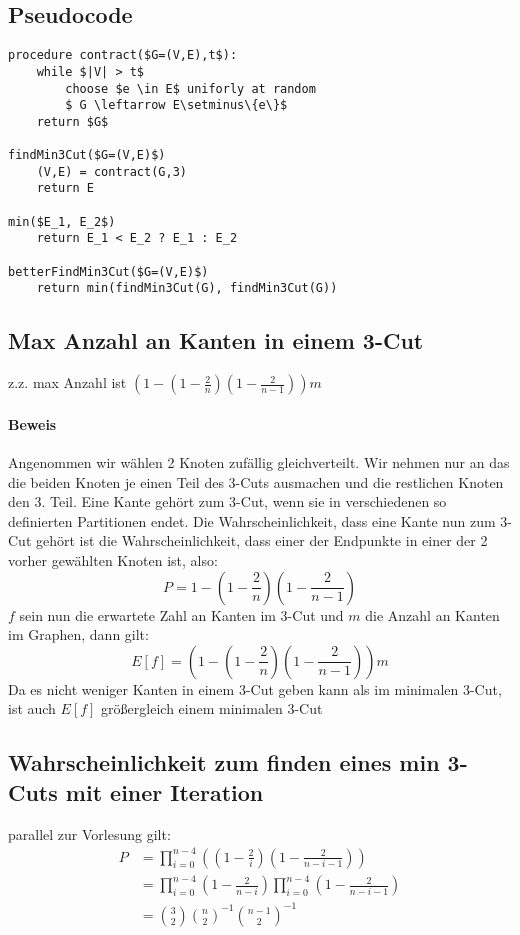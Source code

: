 \documentclass[a4paper,11pt,twoside]{scrartcl}
\begin{document}
\subsection{Pseudocode}
\begin{lstlisting}
procedure contract($G=(V,E),t$):
	while $|V| > t$
		choose $e \in E$ uniforly at random
		$ G \leftarrow E\setminus\{e\}$
	return $G$
	
findMin3Cut($G=(V,E)$)
	(V,E) = contract(G,3)
	return E

min($E_1, E_2$)
	return E_1 < E_2 ? E_1 : E_2
	
betterFindMin3Cut($G=(V,E)$)
	return min(findMin3Cut(G), findMin3Cut(G))
\end{lstlisting}
\subsection{Max Anzahl an Kanten in einem 3-Cut}
z.z. max Anzahl ist $ \left( 1-\left( 1-\frac{2}{n} \right)\left( 1-\frac{2}{n-1} \right) \right)m$
\paragraph{Beweis}
Angenommen wir wählen 2 Knoten zufällig gleichverteilt. Wir nehmen nur an das die beiden Knoten je einen Teil des 3-Cuts ausmachen und die restlichen Knoten den 3. Teil. Eine Kante gehört zum 3-Cut, wenn sie in verschiedenen so definierten Partitionen endet. Die Wahrscheinlichkeit, dass eine Kante nun zum 3-Cut gehört ist die Wahrscheinlichkeit, dass einer der Endpunkte in einer der 2 vorher gewählten Knoten ist, also:
\[ P = 1-\left( 1- \frac{2}{n} \right)\left( 1-\frac{2}{n-1} \right) \]
$f$ sein nun die erwartete Zahl an Kanten im 3-Cut und $m$ die Anzahl an Kanten im Graphen, dann gilt:
\[ E[f] = \left( 1-\left( 1-\frac{2}{n} \right)\left( 1-\frac{2}{n-1} \right) \right)m \]
Da es nicht weniger Kanten in einem 3-Cut geben kann als im minimalen 3-Cut, ist auch $E[f]$ größergleich einem minimalen 3-Cut
\subsection{Wahrscheinlichkeit zum finden eines min 3-Cuts mit einer Iteration}
parallel zur Vorlesung gilt:
\begin{align*}
P &= \prod_{i = 0}^{n-4}\left( \left( 1-\frac{2}{i} \right)\left( 1-\frac{2}{n-i-1} \right) \right)\\
&= \prod_{i = 0}^{n-4} \left( 1-\frac{2}{n-i} \right)\prod_{i = 0}^{n-4}\left( 1-\frac{2}{n-i-1} \right)\\
&=\binom{3}{2}\binom{n}{2}^{-1}\binom{n-1}{2}^{-1}
\end{align*}
\end{document}
